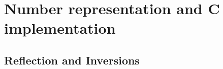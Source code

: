 \section{Number representation and C implementation}

\subsection{Reflection and Inversions}

\begin{lstlisting}
  
\end{lstlisting}
